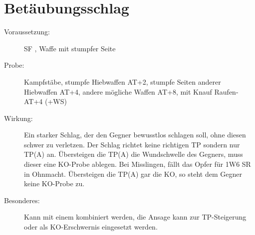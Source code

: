 \section{Betäubungsschlag}
\label{bAT.betaeubungsschlag}
\begin{description}
    \item[Voraussetzung:]
        SF , Waffe mit stumpfer Seite
    \item[Probe:]
        Kampfstäbe, stumpfe Hiebwaffen AT+2, stumpfe Seiten anderer Hiebwaffen AT+4, andere mögliche Waffen AT+8, mit Knauf Raufen-AT+4 (+WS)
    \item[Wirkung:]
        Ein starker Schlag, der den Gegner bewusstlos schlagen soll, ohne diesen schwer zu verletzen.
        Der Schlag richtet keine richtigen TP sondern nur TP(A) an.
        Übersteigen die TP(A) die Wundschwelle des Gegners, muss dieser eine KO-Probe ablegen.
        Bei Misslingen, fällt das Opfer für 1W6 SR in Ohnmacht.
        Übersteigen die TP(A) gar die KO, so steht dem Gegner keine KO-Probe zu.
    \item[Besonderes:]
        Kann mit einem  kombiniert werden, die Ansage kann zur TP-Steigerung oder als KO-Erschwernis eingesetzt werden.
\end{description}
